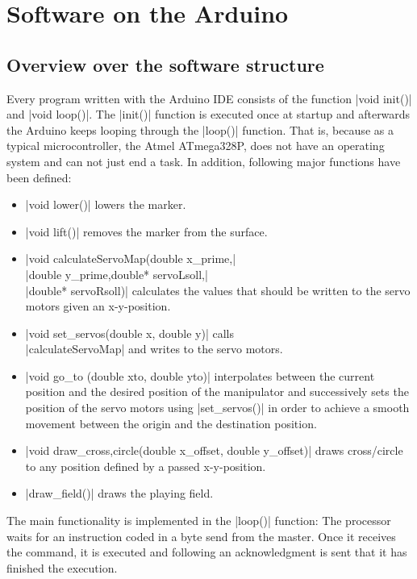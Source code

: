 \documentclass{sig-alternate-05-2015}
\begin{document}
\section{Software on the Arduino}
\subsection{Overview over the software structure}
Every program written with the Arduino IDE consists of the function |void init()| and |void loop()|. The |init()| function is executed once at startup and afterwards the Arduino keeps looping through the |loop()| function. That is, because as a typical microcontroller, the Atmel ATmega328P, does not have an operating system and can not just end a task. In addition, following major functions have been defined:

\begin{itemize}
	\item |void lower()| lowers the marker.
	\item |void lift()| removes the marker from the surface.
	\item |void calculateServoMap(double x_prime,|\\|double y_prime,double* servoLsoll,|\\|double* servoRsoll)|
	 calculates the values that should be written to the servo motors given an x-y-position.
	\item |void set_servos(double x, double y)| calls\\ |calculateServoMap| and writes to the servo motors.
	\item  |void go_to (double xto, double yto)| interpolates between the current position and the desired position of the manipulator and successively sets the position of the servo motors using |set_servos()| in order to achieve a smooth movement between the origin and the destination position.
	\item |void draw_{cross,circle}(double x_offset, double y_offset)| draws cross/circle to any position defined by a passed x-y-position.
	\item |draw_field()| draws the playing field.
\end{itemize}

The main functionality is implemented in the |loop()| function: The processor waits for an instruction coded in a byte send from the master. Once it receives the command, it is executed and following an acknowledgment is sent that it has finished the execution.
\end{document}
